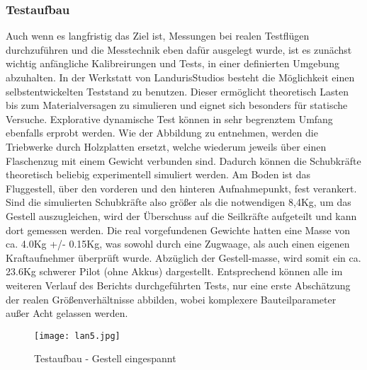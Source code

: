 \clearpage
\subsubsection{Testaufbau}
Auch wenn es langfristig das Ziel ist, Messungen bei realen Testflügen durchzuführen und die Messtechnik eben dafür ausgelegt wurde,
ist es zunächst wichtig anfängliche Kalibreirungen und Tests, in einer definierten Umgebung abzuhalten.
In der Werkstatt von LandurisStudios besteht die Möglichkeit einen selbstentwickelten Teststand zu benutzen.
Dieser ermöglicht theoretisch Lasten bis zum Materialversagen zu simulieren und eignet sich besonders für statische Versuche.
Explorative dynamische Test können in sehr begrenztem Umfang ebenfalls erprobt werden.   Wie der Abbildung zu entnehmen, werden die Triebwerke durch Holzplatten ersetzt,
welche wiederum jeweils über einen Flaschenzug mit einem Gewicht verbunden sind. Dadurch können die Schubkräfte theoretisch beliebig experimentell simuliert werden.
Am Boden ist das Fluggestell, über den vorderen und den hinteren Aufnahmepunkt, fest verankert. Sind die simulierten Schubkräfte also größer als die notwendigen 8,4Kg,
um das Gestell auszugleichen, wird der Überschuss auf die Seilkräfte aufgeteilt und kann dort gemessen werden.
Die real vorgefundenen Gewichte hatten eine Masse von ca. 4.0Kg +/- 0.15Kg, was sowohl durch eine Zugwaage, als auch einen eigenen Kraftaufnehmer überprüft wurde.
Abzüglich der Gestell-masse, wird somit ein ca. 23.6Kg schwerer Pilot (ohne Akkus) dargestellt. Entsprechend können alle im weiteren Verlauf des Berichts durchgeführten Tests,
nur eine erste Abschätzung der realen Größenverhältnisse abbilden, wobei komplexere Bauteilparameter außer Acht gelassen werden.
\begin{figure}[htbp]
    \begin{center}
        \texttt{[image: lan5.jpg]}
        \caption[Testaufbau - Gestell eingespannt (Abbildungsverzeichnis)]{Testaufbau - Gestell eingespannt}
        
        \label{fig:lan5}
    \end{center}
\end{figure}

